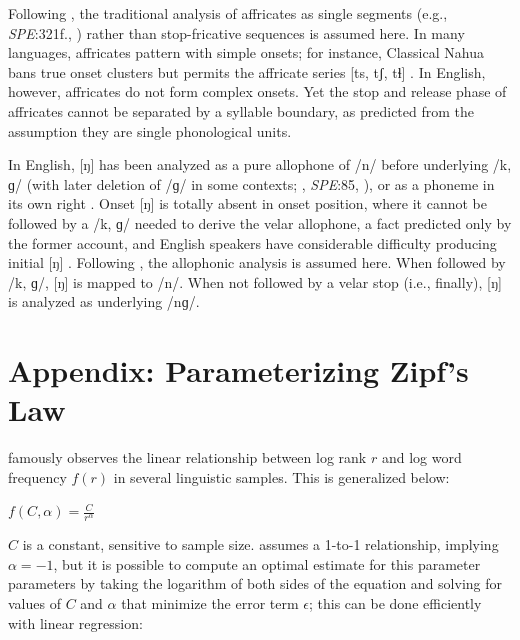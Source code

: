 \documentclass[12pt]{article}
\begin{document}
Following \citet{Pierrehumbert1994}, the traditional analysis of affricates as single segments (e.g., \emph{SPE}:321f., \citealp[24]{Jakobson1961}) rather than stop-fricative sequences \citep[e.g.,][]{Hualde1988,Lombardi1990} is assumed here. In many languages, affricates pattern with simple onsets; for instance, Classical Nahua bans true onset clusters but permits the affricate series [ts, tʃ, tɬ] \citep[9]{Launey2011}. In English, however, affricates do not form complex onsets. Yet the stop and release phase of affricates cannot be separated by a syllable boundary, as predicted from the assumption they are single phonological units.

In English, [ŋ] has been analyzed as a pure allophone of /n/ before underlying /k, ɡ/ (with later deletion of /ɡ/ in some contexts; \citealt[65f.]{Borowsky1986}, \emph{SPE}:85, \citealt[62]{Halle1985a}), or as a phoneme in its own right \citep[e.g.,][]{Jusczyk2002,Sapir1925}. Onset [ŋ] is totally absent in onset position, where it cannot be followed by a /k, ɡ/ needed to derive the velar allophone, a fact predicted only by the former account, and English speakers have considerable difficulty producing initial [ŋ] \citep{Rusaw2009}. Following \citet{Pierrehumbert1994}, the allophonic analysis is assumed here. When followed by /k, ɡ/, [ŋ] is mapped to /n/. When not followed by a velar stop (i.e., finally), [ŋ] is analyzed as underlying /nɡ/.

\section{Appendix: Parameterizing Zipf's Law}
\label{zr}

\citet{Zipf1949} famously observes the linear relationship between log rank $r$ and log word frequency $f(r)$ in several linguistic samples. This is generalized below:

\begin{unlabeledexample} 
$\displaystyle f(C, \alpha) = \frac{C}{r^\alpha}$ 
\end{unlabeledexample} 

\noindent 
$C$ is a constant, sensitive to sample size. \citeauthor{Zipf1949} assumes a 1-to-1 relationship, implying $\alpha = -1$, but it is possible to compute an optimal estimate for this parameter parameters by taking the logarithm of both sides of the equation and solving for values of $C$ and $\alpha$ that minimize the error term $\epsilon$; this can be done efficiently with linear regression:
\end{document}
